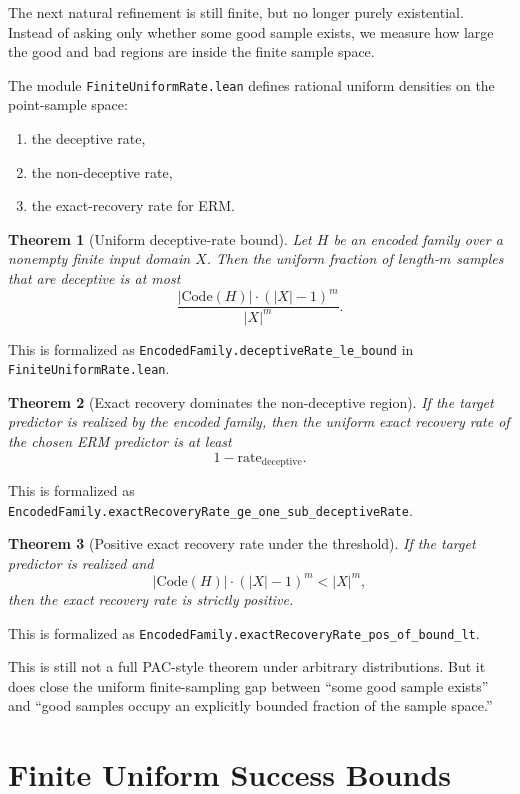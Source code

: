 \documentclass[11pt]{article}
\newtheorem{theorem}{Theorem}[section]
\theoremstyle{remark}
\begin{document}
The next natural refinement is still finite, but no longer purely existential.
Instead of asking only whether some good sample exists, we measure how large the
good and bad regions are inside the finite sample space.

The module \texttt{FiniteUniformRate.lean} defines rational uniform densities on
the point-sample space:
\begin{enumerate}[leftmargin=1.5em]
  \item the deceptive rate,
  \item the non-deceptive rate,
  \item the exact-recovery rate for ERM.
\end{enumerate}

\begin{theorem}[Uniform deceptive-rate bound]
Let \(H\) be an encoded family over a nonempty finite input domain \(X\).  Then
the uniform fraction of length-\(m\) samples that are deceptive is at most
\[
  \frac{|\mathrm{Code}(H)| \cdot (|X|-1)^m}{|X|^m}.
\]
\end{theorem}

\noindent
This is formalized as
\texttt{EncodedFamily.deceptiveRate\_le\_bound} in
\texttt{FiniteUniformRate.lean}.

\begin{theorem}[Exact recovery dominates the non-deceptive region]
If the target predictor is realized by the encoded family, then the uniform exact
recovery rate of the chosen ERM predictor is at least
\[
  1 - \mathrm{rate}_{\mathrm{deceptive}}.
\]
\end{theorem}

\noindent
This is formalized as
\texttt{EncodedFamily.exactRecoveryRate\_ge\_one\_sub\_deceptiveRate}.

\begin{theorem}[Positive exact recovery rate under the threshold]
If the target predictor is realized and
\[
  |\mathrm{Code}(H)| \cdot (|X|-1)^m < |X|^m,
\]
then the exact recovery rate is strictly positive.
\end{theorem}

\noindent
This is formalized as
\texttt{EncodedFamily.exactRecoveryRate\_pos\_of\_bound\_lt}.

This is still not a full PAC-style theorem under arbitrary distributions.  But it
does close the uniform finite-sampling gap between ``some good sample exists'' and
``good samples occupy an explicitly bounded fraction of the sample space.''

\section{Finite Uniform Success Bounds}
\end{document}
